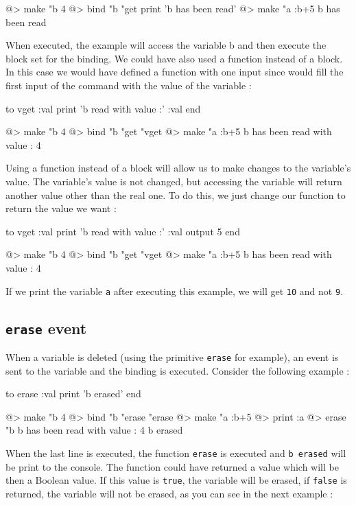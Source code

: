 \begin{verbatimtab}  
@> make "b 4 
@> bind "b "get {print 'b has been read'}
@> make "a :b+5
b has been read
\end{verbatimtab}

When executed, the example will access the variable b and then execute the block set for the binding. We could have also used a function instead of a block. In this case we would have defined a function with one input since \squirrel would fill the first input of the command with the value of the variable :

\begin{verbatimtab}
to vget :val
	print 'b read with value :' :val
end	

@> make "b 4 
@> bind "b "get "vget
@> make "a :b+5
b has been read with value : 4
\end{verbatimtab}

Using a function instead of a block will allow us to make changes to the variable's value. The variable's value is not changed, but accessing the variable will return another value other than the real one. To do this, we just change our function to return the value we want :

\begin{verbatimtab}
to vget :val
	print 'b read with value :' :val
	output 5
end
	
@> make "b 4
@> bind "b "get "vget
@> make "a :b+5
b has been read with value : 4
\end{verbatimtab}

If we print the variable {\tt a} after executing this example, we will get {\tt 10} and not {\tt 9}.

\subsection{{\tt erase} event}

When a variable is deleted (using the primitive {\tt erase} for example), an event is sent to the variable and the binding is executed. Consider the following example :

\begin{verbatimtab}
to erase :val
	print 'b erased'
end

@> make "b 4
@> bind "b "erase "erase
@> make "a :b+5
@> print :a
@> erase "b
b has been read with value : 4
b erased
\end{verbatimtab}

When the last line is executed, the function {\tt erase} is executed and {\tt b erased} will be print to the console. The function could have returned a value which will be then a Boolean value.  If this value is {\tt true}, the variable will be erased, if {\tt false} is returned, the variable will not be erased, as you can see in the next example :

